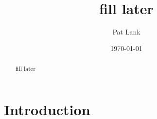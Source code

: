 \documentclass[11pt]{amsart}
\title[fill later]{fill later}
\author[P.~Lank]{Pat Lank}
\date{\today}
\newcounter{intro}
\theoremstyle{plain}
\theoremstyle{definition}
\numberwithin{equation}{section}
\numberwithin{theorem}{section}
\begin{document}
    
\begin{abstract}
    fill later
\end{abstract}

\maketitle

\tableofcontents

\section{Introduction}
\label{sec:intro}



\end{document}
